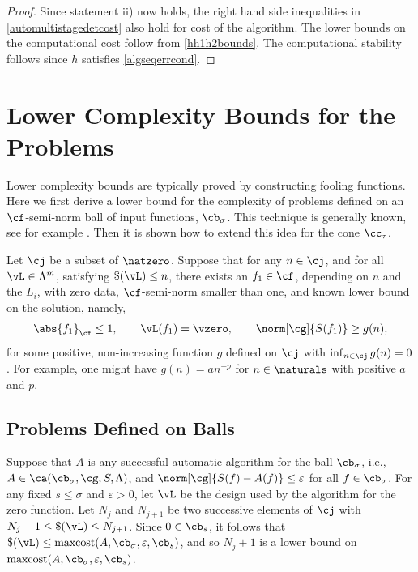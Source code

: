 \documentclass[]{elsarticle}
\DeclareMathOperator{\maxcost}{maxcost}
\theoremstyle{definition}
\theoremstyle{remark}
\newcommand{\Fnorm}[1]{\abs{#1}_{\cf}}
\newcommand{\Gnorm}[1]{\norm[\cg]{#1}}
\begin{document}
\begin{proof}
Since statement ii) now holds, the right hand side inequalities in \eqref{automultistagedetcost} also hold for cost of the algorithm.  The lower bounds on the computational cost follow from \eqref{hh1h2bounds}.  The computational stability follows since $h$ satisfies \eqref{algseqerrcond}.
\end{proof}


\section{Lower Complexity Bounds for the Problems} \label{LowBoundSec}
Lower complexity bounds are typically proved by constructing fooling functions.  Here we first derive a lower bound for the complexity of problems defined on an $\cf$-semi-norm ball of input functions, $\cb_\sigma$.  This technique is generally known, see for example \cite[p.\ 11--12]{TraWer98}.  Then it is shown how to extend this idea for the cone $\cc_{\tau}$. 

Let $\cj$ be a subset of $\natzero$.  Suppose that for any $n \in \cj$, and for all $\vL \in \Lambda^m$, satisfying $\$(\vL)\le n$, there exists an $f_1 \in \cf$, depending on $n$ and the $L_i$, with zero data, $\cf$-semi-norm smaller than one, and known lower bound on the solution, namely,
\begin{equation} \label{assumpfone}
\Fnorm{f_1} \le 1, \qquad \vL(f_1)= \vzero, \qquad
\norm[\cg]{S(f_1)} \ge g(n), 
\end{equation}
for some positive, non-increasing function $g$ defined on $\cj$ with $\inf_{n \in \cj} g(n)=0$.  For example, one might have $g(n)=a n^{-p}$ for $n \in \naturals$ with positive $a$ and $p$.

\subsection{Problems Defined on Balls} 
Suppose that $A$ is any successful automatic algorithm for the ball $\cb_{\sigma}$, i.e., $A \in \ca(\cb_{\sigma},\cg,S,\Lambda)$, and $\Gnorm{S(f)-A(f)}\le \varepsilon$ for all $f \in \cb_{\sigma}$.  For any fixed $s \le \sigma$ and $\varepsilon>0$, let $\vL$ be the design used by the algorithm for the zero function.  Let $N_{j}$ and $N_{j+1}$ be two successive elements of $\cj$ with $N_{j}+1 \le \$(\vL) \le N_{j+1}$. Since $0 \in \cb_s$, it follows that $\$(\vL) \le \maxcost(A,\cb_{\sigma},\varepsilon,\cb_{s})$, and so $N_{j}+1$ is a lower bound on $\maxcost(A,\cb_{\sigma},\varepsilon,\cb_{s})$.
\end{document}

